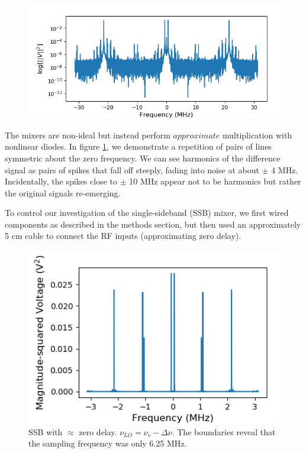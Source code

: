 \documentclass[a4paper]{article}
\begin{document}

\begin{figure}
\centering
\includegraphics[width=.8\linewidth]{7-2}
\caption{}
\label{fig:intermods}
\end{figure}

The mixers are non-ideal but instead perform $approximate$ multiplication with nonlinear diodes. In figure \ref{fig:intermods}, we demonstrate a repetition of pairs of lines symmetric about the zero frequency. We can see harmonics of the difference signal as pairs of spikes that fall off steeply, fading into noise at about $\pm$ 4 MHz. Incidentally, the spikes close to $\pm$ 10 MHz appear not to be harmonics but rather the original signals re-emerging.

To control our investigation of the single-sideband (SSB) mixer, we first wired components as described in the methods section, but then used an approximately 5 cm cable to connect the RF inputs (approximating zero delay). %

\begin{figure}
\centering
\includegraphics[width=.8\linewidth]{7-3/pln}
\caption{SSB with $\approx$ zero delay. $\nu_{LO} = \nu_s - \Delta \nu$. The boundaries reveal that the sampling frequency was only 6.25 MHz.}
\label{fig:failure}
\end{figure}
\end{document}
